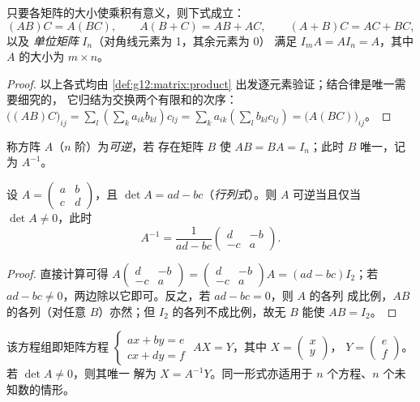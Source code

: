 \begin{proposition}[矩阵代数的运算规则]\label{prop:g12:matrix:rules}
只要各矩阵的大小使乘积有意义，则下式成立：
\[
(AB)C = A(BC), \qquad A(B + C) = AB + AC, \qquad (A+B)C = AC + BC,
\]
以及 \emph{单位矩阵} $I_n$（对角线元素为 1，其余元素为 0）
满足 $I_m A = A I_n = A$，其中 $A$ 的大小为 $m \times n$。
\end{proposition}

\begin{proof}
以上各式均由
\cref{def:g12:matrix:product} 出发逐元素验证；结合律是唯一需要细究的，
它归结为交换两个有限和的次序：
$\bigl((AB)C\bigr)_{ij} = \sum_l \left(\sum_k a_{ik}b_{kl}\right) c_{lj}
= \sum_k a_{ik} \left(\sum_l b_{kl} c_{lj}\right)
= \bigl(A(BC)\bigr)_{ij}$。
\end{proof}

\begin{definition}[逆矩阵]\label{def:g12:matrix:inverse}
称方阵 $A$（$n$ 阶）为\emph{可逆}，若
存在矩阵 $B$ 使 $AB = BA = I_n$；此时 $B$ 唯一，记为
$A^{-1}$。
\end{definition}

\begin{proposition}\label{prop:g12:matrix:inverse2x2}
设 $A = \begin{pmatrix} a & b\\ c & d\end{pmatrix}$，且
$\det A = ad - bc$（\emph{行列式}）。则 $A$
可逆当且仅当 $\det A \neq 0$，此时
\[
A^{-1} = \frac{1}{ad - bc}\begin{pmatrix} d & -b\\ -c & a\end{pmatrix}.
\]
\end{proposition}

\begin{proof}
直接计算可得
$A \begin{pmatrix} d & -b\\ -c & a\end{pmatrix}
= \begin{pmatrix} d & -b\\ -c & a\end{pmatrix} A = (ad - bc) I_2$；若
$ad - bc \neq 0$，两边除以它即可。反之，若 $ad - bc = 0$，则 $A$ 的各列
成比例，$AB$ 的各列（对任意 $B$）亦然；但
$I_2$ 的各列不成比例，故无 $B$ 能使 $AB = I_2$。
\end{proof}

\begin{method}[线性方程组]\label{met:g12:matrix:systems}
该方程组即矩阵方程
$\begin{cases} ax + by = e\\ cx + dy = f \end{cases}$
$AX = Y$，其中
$X = \begin{pmatrix} x \\ y\end{pmatrix}$，
$Y = \begin{pmatrix} e \\ f\end{pmatrix}$。若 $\det A \neq 0$，则其唯一
解为 $X = A^{-1}Y$。同一形式亦适用于
$n$ 个方程、$n$ 个未知数的情形。
\end{method}

